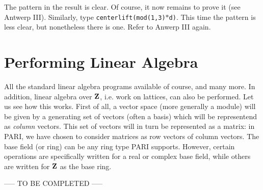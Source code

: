 The pattern in the result is clear. Of course, it now remains to prove it
(see Antwerp III). Similarly, type {\tt centerlift(mod(1,3)$*$d)}. This time
the pattern is less clear, but nonetheless there is one. Refer to Anwerp III
again.
\medskip
\section{Performing Linear Algebra}
\medskip
All the standard linear algebra programs available of course, and many more.
In addition, linear algebra over ${\bf Z}$, i.e. work on lattices, can also be
performed. Let us see how this works.
First of all, a vector space (more generally a module) will be given by a
generating set of vectors (often a basis) which will be representend as
{\it column} vectors. This set of vectors will in turn be represented as
a matrix: in PARI, we have chosen to consider matrices as row vectors of
column vectors. The base field (or ring) can be any ring type PARI supports.
However, certain operations are specifically written for a real or complex
base field, while others are written for ${\bf Z}$ as the base ring.

----- TO BE COMPLETED -----





